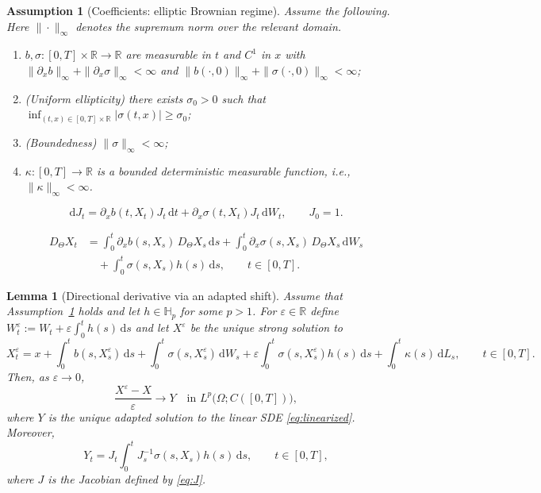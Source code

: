 \documentclass[10pt,a4paper]{amsart}
\newtheorem{assumption}{Assumption}
\newtheorem{lemma}{Lemma}
\newcommand{\Hb}{\mathbb{H}}
\newcommand{\R}{\mathbb{R}}
\newcommand{\dd}{\mathrm{d}}
\newcommand{\dt}{\,\dd t}
\begin{document}
\begin{assumption}[Coefficients: elliptic Brownian regime]\label{ass:elliptic}
Assume the following. Here $\|\cdot\|_\infty$ denotes the supremum norm over the relevant domain.
\begin{enumerate}[label=(E\arabic*),leftmargin=2.7em]
\item $b,\sigma:[0,T]\times\R\to\R$ are measurable in $t$ and $C^1$ in $x$ with
$\|\partial_x b\|_\infty+\|\partial_x\sigma\|_\infty<\infty$ and $\|b(\cdot,0)\|_\infty+\|\sigma(\cdot,0)\|_\infty<\infty$;
\item (\emph{Uniform ellipticity}) there exists $\sigma_0>0$ such that $\inf_{(t,x)\in[0,T]\times\R}|\sigma(t,x)|\ge\sigma_0$;
\item (\emph{Boundedness}) $\|\sigma\|_\infty<\infty$;
\item $\kappa:[0,T]\to\R$ is a bounded \emph{deterministic} measurable function, i.e., $\|\kappa\|_\infty<\infty$.
\end{enumerate}
\end{assumption}

\begin{equation}\label{eq:J}
\dd J_t=\partial_x b(t,X_t)J_t\dt+\partial_x\sigma(t,X_t)J_t\,\dd W_t,\qquad J_0=1.
\end{equation}

\begin{equation}\label{eq:linearized}
\begin{aligned}
D_\Theta X_t
&=\int_0^t \partial_x b(s,X_s)\,D_\Theta X_s\,\dd s
+\int_0^t \partial_x\sigma(s,X_s)\,D_\Theta X_s\,\dd W_s\\
&\quad+\int_0^t \sigma(s,X_s)h(s)\,\dd s,\qquad t\in[0,T].
\end{aligned}
\end{equation}

\begin{lemma}[Directional derivative via an adapted shift]\label{lem:DXrep}
Assume that Assumption~\ref{ass:elliptic} holds and let $h\in \Hb_p$ for some $p>1$.
For $\varepsilon\in\R$ define $W_t^\varepsilon:=W_t+\varepsilon\int_0^t h(s)\,\dd s$ and let $X^\varepsilon$ be the unique strong
solution to
\begin{equation}\label{eq:SDE-eps}
X_t^\varepsilon=x+\int_0^t b(s,X_s^\varepsilon)\,\dd s+\int_0^t \sigma(s,X_s^\varepsilon)\,\dd W_s
+\varepsilon\int_0^t \sigma(s,X_s^\varepsilon)h(s)\,\dd s+\int_0^t \kappa(s)\,\dd L_s,\qquad t\in[0,T].
\end{equation}
Then, as $\varepsilon\to0$,
\[
\frac{X^\varepsilon-X}{\varepsilon}\longrightarrow Y
\quad\text{in }L^p\big(\Omega;C([0,T])\big),
\]
where $Y$ is the unique adapted solution to the linear SDE \eqref{eq:linearized}.
Moreover,
\[
Y_t=J_t\int_0^t J_s^{-1}\sigma(s,X_s)h(s)\,\dd s,\qquad t\in[0,T],
\]
where $J$ is the Jacobian defined by \eqref{eq:J}.
\end{lemma}
\end{document}
